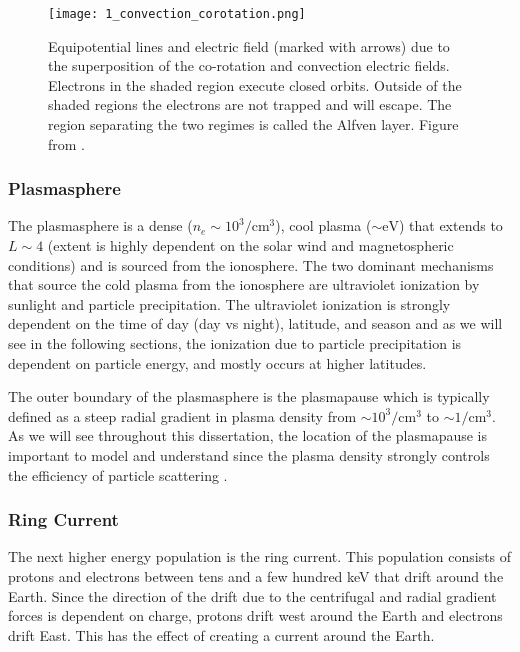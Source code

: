 \begin{figure}
\texttt{[image: 1\_convection\_corotation.png]}
\caption{Equipotential lines and electric field (marked with arrows) due to the superposition of the co-rotation and convection electric fields. Electrons in the shaded region execute closed orbits. Outside of the shaded regions the electrons are not trapped and will escape. The region separating the two regimes is called the Alfven layer. Figure from \citet{Baumjohann1997}.}
\label{Intro:E_fields}
\end{figure}

\subsubsection{Plasmasphere}
The plasmasphere is a dense ($n_e \sim 10^3/\mathrm{cm}^3$), cool plasma ($\sim \mathrm{eV}$) that extends to $L \sim 4$ (extent is highly dependent on the solar wind and magnetospheric conditions) and is sourced from the ionosphere. The two dominant mechanisms that source the cold plasma from the ionosphere are ultraviolet ionization by sunlight and particle precipitation. The ultraviolet ionization is strongly dependent on the time of day (day vs night), latitude, and season and as we will see in the following sections, the ionization due to particle precipitation is dependent on particle energy, and mostly occurs at higher latitudes.

The outer boundary of the plasmasphere is the plasmapause which is typically defined as a steep radial gradient in plasma density from $\sim 10^3 / \mathrm{cm}^3$ to $\sim 1 / \mathrm{cm}^3$. As we will see throughout this dissertation, the location of the plasmapause is important to model \citep[e.g.][]{O'Brien2003empirical} and understand since the plasma density strongly controls the efficiency of particle scattering \citep{Horne2005}.

\subsubsection{Ring Current}
The next higher energy population is the ring current. This population consists of protons and electrons between tens and a few hundred keV that drift around the Earth. Since the direction of the drift due to the centrifugal and radial gradient forces is dependent on charge, protons drift west around the Earth and electrons drift East. This has the effect of creating a current around the Earth. 

